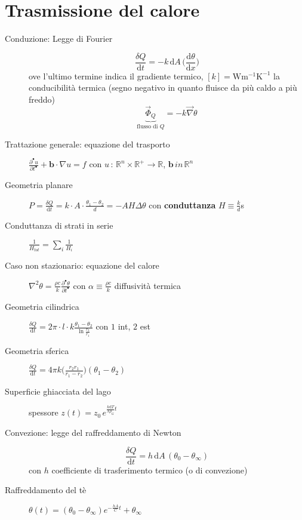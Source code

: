 \documentclass[10pt, oneside]{article}
\begin{document}
\section{Trasmissione del calore}
\begin{description}
\item[\large Conduzione: Legge di Fourier] 
\[\boxed{\frac{\delta Q}{\mathrm{d}t} = - k \, \mathrm{d}A \, \bigg(\frac{\mathrm{d}\theta}{\mathrm{d}x}\bigg)}\] ove l'ultimo termine indica il gradiente termico, $[k] = \mathrm{W m^{-1} K^{-1}}$ la conducibilità termica (segno negativo in quanto fluisce da più caldo a più freddo)
\[\underbrace{\vec{\Phi}_Q}_{\textrm{flusso di } Q} = - k \vec{\nabla} \theta\]
\item[Trattazione generale: equazione del trasporto] $\displaystyle \frac{\partial^{•} u}{\partial t^{•}} + \mathbf{b} \cdot \nabla u = f$ con $u \, : \, \mathbb{R}^n \times \mathbb{R}^+ \rightarrow \mathbb{R}$, $\mathbf{b} \, in \, \mathbb{R}^n$
\item[Geometria planare] $\displaystyle P = \frac{\delta Q}{\mathrm{d} t} = k \cdot A \cdot \frac{\theta_1 - \theta_2}{d} = - A H \Delta \theta$ con \textbf{conduttanza} $\displaystyle H \equiv \frac{k}{d}$s
\item[Conduttanza di strati in serie] $\displaystyle \frac{1}{H_{tot}} = \sum_i \frac{1}{H_i}$
\item[Caso non stazionario: equazione del calore] $\displaystyle \nabla^2 \theta = \frac{\rho c}{k} \frac{\partial^{•} \theta}{\partial t^{•}}$ con $\displaystyle \alpha \equiv \frac{\rho c}{k}$ diffusività termica
\item[Geometria cilindrica] $\displaystyle \frac{\delta Q}{\mathrm{d} t} = 2 \pi \cdot l \cdot k \frac{\theta_1 - \theta_2}{\displaystyle \ln \frac{r_2}{r_1}}$ con $1$ int, $2$ est
\item[Geometria sferica] $\displaystyle \frac{\delta Q}{\mathrm{d} t} = 4 \pi k \bigg(\frac{r_2 r_1}{r_1 - r_2}\bigg)(\theta_1 - \theta_2)$
\item[Superficie ghiacciata del lago] spessore $\displaystyle z(t) = z_0 \, e^{\displaystyle \frac{k \mathrm{d}T}{\lambda \rho_G}t}$
\item[\large Convezione: legge del raffreddamento di Newton]
\[\boxed{\frac{\delta Q}{\mathrm{d} t} = h \, \mathrm{d}A \,(\theta_0 - \theta_\infty)}\]
con $h$ coefficiente di trasferimento termico (o di convezione)
\item[Raffreddamento del tè] $\displaystyle \theta(t) = (\theta_0 - \theta_\infty) e^{\displaystyle - \frac{hA}{C}t} + \theta_\infty$

\end{description}
\end{document}
